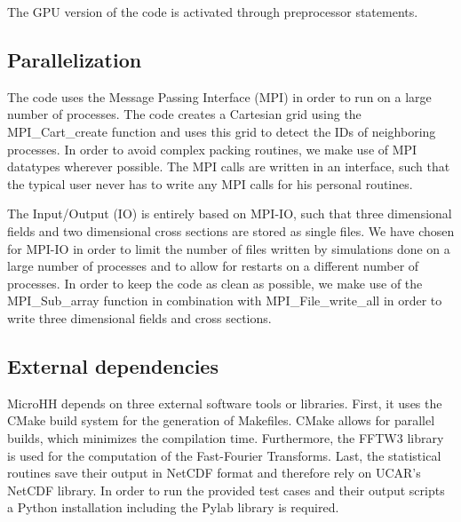 \documentclass[gmd]{copernicus}
\begin{document}
The GPU version of the code is activated through preprocessor statements. 

\subsection{Parallelization}
The code uses the Message Passing Interface (MPI) in order to run on a large number of processes. The code creates a Cartesian grid using the MPI\_Cart\_create function and uses this grid to detect the IDs of neighboring processes. In order to avoid complex packing routines, we make use of MPI datatypes wherever possible. The MPI calls are written in an interface, such that the typical user never has to write any MPI calls for his personal routines.

The Input/Output (IO) is entirely based on MPI-IO, such that three dimensional fields and two dimensional cross sections are stored as single files. We have chosen for MPI-IO in order to limit the number of files written by simulations done on a large number of processes and to allow for restarts on a different number of processes. In order to keep the code as clean as possible, we make use of the MPI\_Sub\_array function in combination with MPI\_File\_write\_all in order to write three dimensional fields and cross sections.


\subsection{External dependencies}
MicroHH depends on three external software tools or libraries. First, it uses the CMake build system for the generation of Makefiles. CMake allows for parallel builds, which minimizes the compilation time. Furthermore, the FFTW3 library \citep{Frigo2005} is used for the computation of the Fast-Fourier Transforms. Last, the statistical routines save their output in NetCDF format and therefore rely on UCAR's NetCDF library. In order to run the provided test cases and their output scripts a Python installation including the Pylab library is required.
\end{document}
